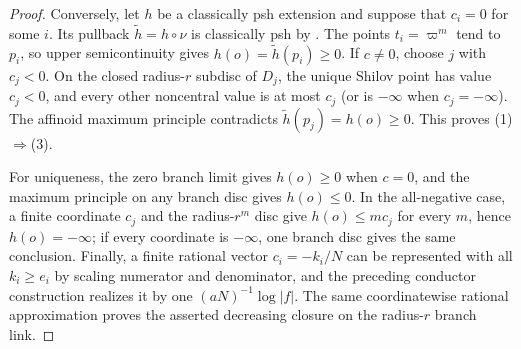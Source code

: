 \begin{proof}
Conversely, let \(h\) be a classically psh extension and suppose that
\(c_i=0\) for some \(i\).  Its pullback \(\widetilde h=h\circ\nu\) is
classically psh by \cite[Proposition~4.2(6)]{GR25Classical}.  The points
\(t_i=\varpi^m\) tend to \(p_i\), so upper
semicontinuity gives \(h(o)=\widetilde h(p_i)\geq0\).  If \(c\ne0\), choose
\(j\) with \(c_j<0\).  On the closed radius-\(r\) subdisc of \(D_j\), the
unique Shilov point has value \(c_j<0\), and every other noncentral value is
at most \(c_j\) (or is \(-\infty\) when \(c_j=-\infty\)).  The affinoid
maximum principle \cite[Theorem~6.4]{GR25Classical} contradicts
\(\widetilde h(p_j)=h(o)\geq0\).  This proves (1)\(\Rightarrow\)(3).

For uniqueness, the zero branch limit gives \(h(o)\geq0\) when \(c=0\),
and the maximum principle on any branch disc gives \(h(o)\leq0\).  In the
all-negative case, a finite coordinate \(c_j\) and the radius-\(r^m\) disc
give \(h(o)\leq m c_j\) for every \(m\), hence \(h(o)=-\infty\); if every
coordinate is \(-\infty\), one branch disc gives the same conclusion.
Finally, a finite rational vector \(c_i=-k_i/N\) can be represented with
all \(k_i\geq e_i\) by scaling numerator and denominator, and the preceding
conductor construction realizes it by one \((aN)^{-1}\log|f|\).  The same
coordinatewise rational approximation proves the asserted decreasing
closure on the radius-\(r\) branch link.
\end{proof}

